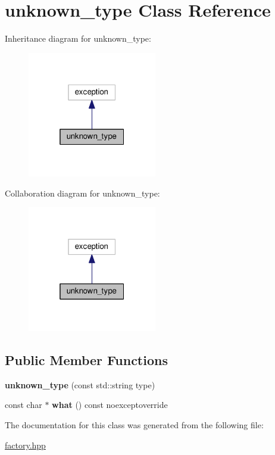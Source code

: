 \hypertarget{classunknown__type}{}\section{unknown\+\_\+type Class Reference}
\label{classunknown__type}


Inheritance diagram for unknown\+\_\+type\+:\nopagebreak
\begin{figure}[H]
\begin{center}
\leavevmode
\includegraphics[width=160pt]{classunknown__type__inherit__graph}
\end{center}
\end{figure}


Collaboration diagram for unknown\+\_\+type\+:\nopagebreak
\begin{figure}[H]
\begin{center}
\leavevmode
\includegraphics[width=160pt]{classunknown__type__coll__graph}
\end{center}
\end{figure}
\subsection*{Public Member Functions}
\begin{DoxyCompactItemize}
\item 
{\bfseries unknown\+\_\+type} (const std\+::string type)\hypertarget{classunknown__type_ad0900df174fd2897ea46896d46d4ce47}{}\label{classunknown__type_ad0900df174fd2897ea46896d46d4ce47}

\item 
const char $\ast$ {\bfseries what} () const noexceptoverride\hypertarget{classunknown__type_a3202522b594d4442f7c3a56a53a81224}{}\label{classunknown__type_a3202522b594d4442f7c3a56a53a81224}

\end{DoxyCompactItemize}


The documentation for this class was generated from the following file\+:\begin{DoxyCompactItemize}
\item 
\hyperlink{factory_8hpp}{factory.\+hpp}\end{DoxyCompactItemize}

